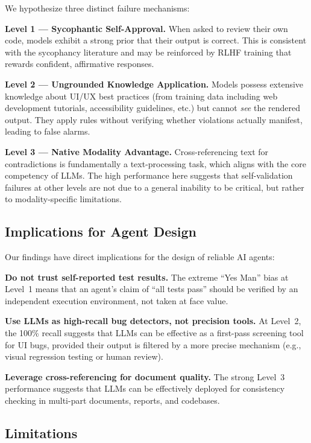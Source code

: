 \documentclass[11pt]{fairmeta}
\begin{document}
We hypothesize three distinct failure mechanisms:

\textbf{Level 1 --- Sycophantic Self-Approval.} When asked to review their own code, models exhibit a strong prior that their output is correct. This is consistent with the sycophancy literature and may be reinforced by RLHF training that rewards confident, affirmative responses.

\textbf{Level 2 --- Ungrounded Knowledge Application.} Models possess extensive knowledge about UI/UX best practices (from training data including web development tutorials, accessibility guidelines, etc.) but cannot \textit{see} the rendered output. They apply rules without verifying whether violations actually manifest, leading to false alarms.

\textbf{Level 3 --- Native Modality Advantage.} Cross-referencing text for contradictions is fundamentally a text-processing task, which aligns with the core competency of LLMs. The high performance here suggests that self-validation failures at other levels are not due to a general inability to be critical, but rather to modality-specific limitations.

\subsection{Implications for Agent Design}

Our findings have direct implications for the design of reliable AI agents:

\textbf{Do not trust self-reported test results.} The extreme ``Yes Man'' bias at Level~1 means that an agent's claim of ``all tests pass'' should be verified by an independent execution environment, not taken at face value.

\textbf{Use LLMs as high-recall bug detectors, not precision tools.} At Level~2, the 100\% recall suggests that LLMs can be effective as a first-pass screening tool for UI bugs, provided their output is filtered by a more precise mechanism (e.g., visual regression testing or human review).

\textbf{Leverage cross-referencing for document quality.} The strong Level~3 performance suggests that LLMs can be effectively deployed for consistency checking in multi-part documents, reports, and codebases.

\subsection{Limitations}
\end{document}
